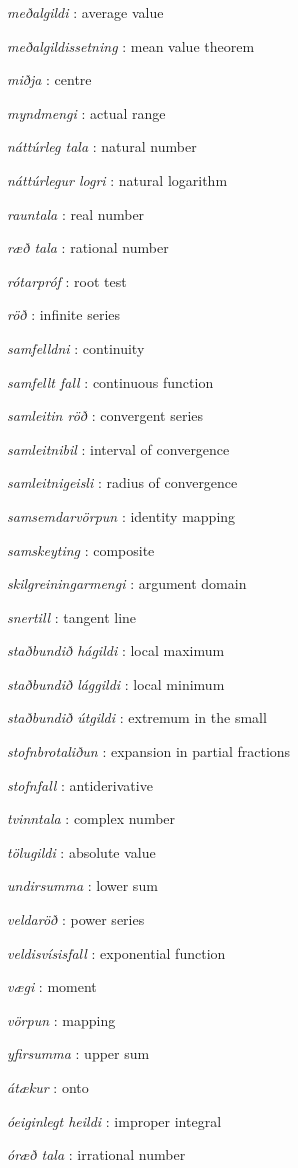 \emph{meðalgildi} : average value

\emph{meðalgildissetning} : mean value theorem


\emph{miðja} : centre

\emph{myndmengi} : actual range

\emph{náttúrleg tala} : natural number


\emph{náttúrlegur logri} : natural logarithm


\emph{rauntala} : real number


\emph{ræð tala} : rational number


\emph{rótarpróf} : root test


\emph{röð} : infinite series

\emph{samfelldni} : continuity


\emph{samfellt fall} : continuous function


\emph{samleitin röð} : convergent series


\emph{samleitnibil} : interval of convergence


\emph{samleitnigeisli} : radius of convergence


\emph{samsemdarvörpun} : identity mapping


\emph{samskeyting} : composite


\emph{skilgreiningarmengi} : argument domain

\emph{snertill} : tangent line

\emph{staðbundið hágildi} : local maximum

\emph{staðbundið lággildi} : local minimum

\emph{staðbundið útgildi} : extremum in the small

\emph{stofnbrotaliðun} : expansion in partial fractions

\emph{stofnfall} : antiderivative

\emph{tvinntala} : complex number


\emph{tölugildi} : absolute value

\emph{undirsumma} : lower sum


\emph{veldaröð} : power series


\emph{veldisvísisfall} : exponential function


\emph{vægi} : moment

\emph{vörpun} : mapping

\emph{yfirsumma} : upper sum


\emph{átækur} : onto

\emph{óeiginlegt heildi} : improper integral


\emph{óræð tala} : irrational number
